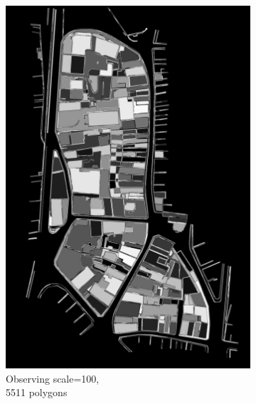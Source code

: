 \documentclass[12pt]{article}
\begin{document}
\begin{figure}[H]
	\begin{subfigure}[b]{.3\textwidth}
		\centering
		\includegraphics[width=1\linewidth]{images/polygon_recovery/felzenswalb1_scale100_region5511.png}  
		\caption{Observing scale=100, \\ 5511 polygons}
	\end{subfigure}
	\begin{subfigure}[b]{.3\textwidth}
		\centering

\end{subfigure}
\end{figure}
\end{document}
